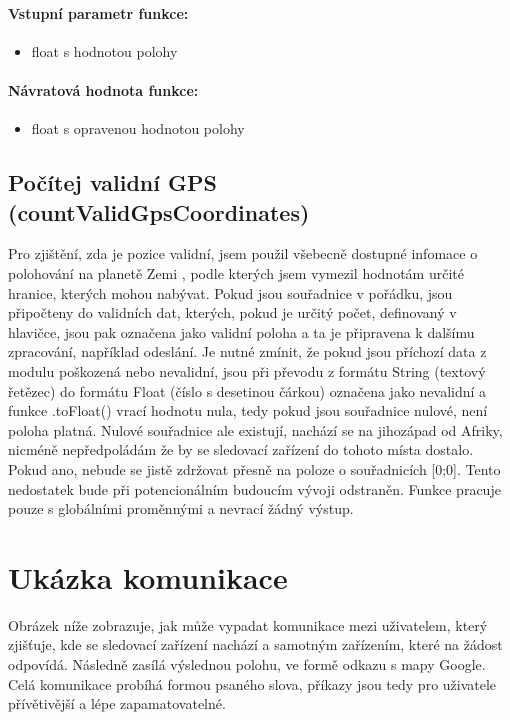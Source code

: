 \documentclass[FM,MP]{tulthesis}  %
\begin{document}
\paragraph{Vstupní parametr funkce:}
\begin{itemize}
\item float s hodnotou polohy
\end{itemize}

\paragraph{Návratová hodnota funkce:}
\begin{itemize}
\item float s opravenou hodnotou polohy
\end{itemize}

\subsection{Počítej validní GPS (countValidGpsCoordinates)}
Pro zjištění, zda je pozice validní, jsem použil všebecně dostupné infomace o polohování na planetě Zemi \cite{geographic}, podle kterých jsem vymezil hodnotám určité hranice, kterých mohou nabývat. Pokud jsou souřadnice v pořádku, jsou připočteny do validních dat, kterých, pokud je určitý počet, definovaný v hlavičce, jsou pak označena jako validní poloha a ta je připravena k dalšímu zpracování, například odeslání. Je nutné zmínit, že pokud jsou příchozí data z modulu poškozená nebo nevalidní, jsou při převodu z formátu String (textový řetězec) do formátu Float (číslo s desetinou čárkou) označena jako nevalidní a funkce .toFloat() vrací hodnotu nula, tedy pokud jsou souřadnice nulové, není poloha platná. Nulové souřadnice ale existují, nachází se na jihozápad od Afriky, nicméně nepředpoládám že by se sledovací zařízení do tohoto místa dostalo. Pokud ano, nebude se jistě zdržovat přesně na poloze o souřadnicích [0;0]. Tento nedostatek bude při potencionálním budoucím vývoji odstraněn. Funkce pracuje pouze s globálními proměnnými a nevrací žádný výstup.

\section{Ukázka komunikace}
Obrázek níže zobrazuje, jak může vypadat komunikace mezi uživatelem, který zjišťuje, kde se sledovací zařízení nachází a samotným zařízením, které na žádost odpovídá. Následně zasílá výslednou polohu, ve formě odkazu s mapy Google. Celá komunikace probíhá formou psaného slova, příkazy jsou tedy pro uživatele přívětivější a lépe zapamatovatelné.
\end{document}
